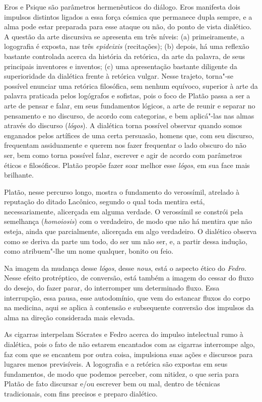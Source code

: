 Eros e Psique são parâmetros hermenêuticos do diálogo. Eros manifesta
dois impulsos distintos ligados a essa força cósmica que permanece dupla
sempre, e a alma pode estar preparada para esse ataque ou não, do ponto
de vista dialético. A questão da arte discursiva se apresenta em três
níveis: (a) primeiramente, a logografia é exposta, nas
três \emph{epideixis} (recitações); (b) depois, há uma reflexão
bastante controlada acerca da história da retórica, da arte da palavra,
de seus principais inventores e inventos; (c) uma apresentação
bastante diligente da superioridade da dialética frente à retórica
vulgar. Nesse trajeto, torna"-se possível enunciar uma retórica
filosófica, sem nenhum equívoco, superior à arte da palavra praticada
pelos logógrafos e sofistas, pois o foco de Platão passa a ser a arte de
pensar e falar, em seus fundamentos lógicos, a arte de reunir e separar
no pensamento e no discurso, de acordo com categorias, e bem aplicá"-las
nas almas através do discurso (\emph{lógos}). A dialética torna possível
observar quando somos enganados pelos artífices de uma certa persuasão,
homens que, com seu discurso, frequentam assiduamente e querem nos fazer
frequentar o lado obscuro do não ser, bem como torna possível falar,
escrever e agir de acordo com parâmetros éticos e filosóficos. Platão
propõe fazer soar melhor esse \emph{lógos}, em sua face mais brilhante.

Platão, nesse percurso longo, mostra o fundamento do verossímil,
atrelado à reputação do ditado Lacônico, segundo o qual toda mentira
está, necessariamente, alicerçada em alguma verdade. O verossímil se
constrói pela semelhança (\emph{homoiosis}) com o verdadeiro, de modo
que não há mentira que não esteja, ainda que parcialmente, alicerçada em
algo verdadeiro. O dialético observa como se deriva da parte um todo, do
ser um não ser, e, a partir dessa indução, como atribuem"-lhe um nome
qualquer, bonito ou feio.

Na imagem da mudança desse \emph{lógos}, desse \emph{nous}, está o
aspecto ético do \emph{Fedro}. Nesse efeito protréptico, de conversão,
está também a imagem do cessar do fluxo do desejo, do fazer parar, do
interromper um determinado fluxo. Essa interrupção, essa pausa, esse
autodomínio, que vem do estancar fluxos do corpo na medicina, aqui se
aplica à contensão e subsequente conversão dos impulsos da alma na
direção considerada mais elevada.

As cigarras interpelam Sócrates e Fedro acerca do impulso intelectual
rumo à dialética, pois o fato de não estarem encantados com as cigarras interrompe
algo, faz com que se encantem por outra coisa, impulsiona suas ações e
discursos para lugares menos previsíveis. A logografia e a retórica são
expostas em seus fundamentos, de modo que podemos perceber, com nitidez,
o que seria para Platão de fato discursar e/\allowbreak{}ou escrever bem ou mal,
dentro de técnicas tradicionais, com fins precisos e preparo dialético.

